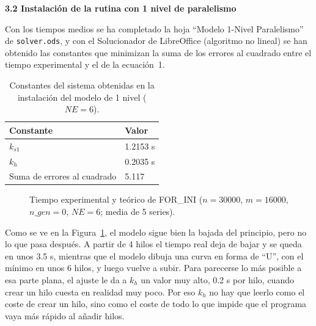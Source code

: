 \documentclass[12pt]{article}
\begin{document}
\begin{enumerate}
\medskip
\noindent\textbf{3.2 Instalación de la rutina con 1 nivel de paralelismo}\par
\smallskip

Con los tiempos medios se ha completado la hoja ``Modelo 1-Nivel Paralelismo'' de \texttt{solver.ods}, y con el Solucionador de LibreOffice (algoritmo no lineal) se han obtenido las constantes que minimizan la suma de los errores al cuadrado entre el tiempo experimental y el de la ecuación~1.

\begin{table}[htbp]
\centering
\begin{tabular}{ll}
\toprule
\textbf{Constante} & \textbf{Valor} \\
\midrule
$k_{s1}$ & 1.2153 s \\
$k_h$ & 0.2035 s \\
Suma de errores al cuadrado & 5.117 \\
\bottomrule
\end{tabular}
\caption{Constantes del sistema obtenidas en la instalación del modelo de 1 nivel ($NE = 6$).}
\label{tab:c3_constantes}
\end{table}

\begin{figure}[htbp]
\centering
{}
\caption{Tiempo experimental y teórico de FOR\_INI ($n = 30000$, $m = 16000$, $n\_gen = 0$, $NE = 6$; media de 5 series).}
\label{fig:c3_ajuste}
\end{figure}

Como se ve en la Figura~\ref{fig:c3_ajuste}, el modelo sigue bien la bajada del principio, pero no lo que pasa después. A partir de 4 hilos el tiempo real deja de bajar y se queda en unos 3.5 s, mientras que el modelo dibuja una curva en forma de ``U'', con el mínimo en unos 6 hilos, y luego vuelve a subir. Para parecerse lo más posible a esa parte plana, el ajuste le da a $k_h$ un valor muy alto, 0.2 s por hilo, cuando crear un hilo cuesta en realidad muy poco. Por eso $k_h$ no hay que leerlo como el coste de crear un hilo, sino como el coste de todo lo que impide que el programa vaya más rápido al añadir hilos.


\end{enumerate}
\end{document}
